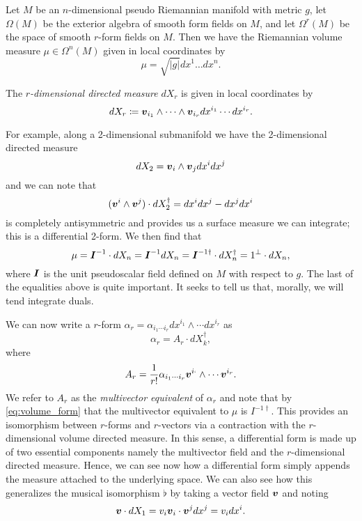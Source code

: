 Let $M$ be an $n$-dimensional pseudo Riemannian manifold with metric $g$, let $\Omega(M)$ be the exterior algebra of smooth form fields on $M$, and let $\Omega^r(M)$ be the space of smooth $r$-form fields on $M$. Then we have the Riemannian volume measure $\mu \in \Omega^n(M)$ given in local coordinates by
\begin{equation}
\mu = \sqrt{|g|} dx^1\dots dx^n.
\end{equation}
\begin{definition}
The \emph{$r$-dimensional directed measure} $dX_r$ is given in local coordinates by
\begin{equation}
    dX_r \coloneqq \boldsymbol{v}_{i_1} \wedge \cdots \wedge \boldsymbol{v}_{i_r} dx^{i_1} \cdots dx^{i_r}. 
\end{equation}
\end{definition}
For example, along a 2-dimensional submanifold we have the 2-dimensional directed measure 
\begin{equation}
    dX_2 = \boldsymbol{v}_i \wedge \boldsymbol{v}_j dx^i dx^j
\end{equation}
and we can note that 
\begin{equation}
(\boldsymbol{v}^i \wedge \boldsymbol{v}^j)\cdot dX_2^\dagger = dx^idx^j - dx^j dx^i
\end{equation}
is completely antisymmetric and provides us a surface measure we can integrate; this is a differential 2-form. We then find that
\begin{equation}
\label{eq:volume_form}
\mu = \boldsymbol{I}^{-1} \cdot dX_n = \boldsymbol{I}^{-1} dX_n = \boldsymbol{I}^{-1 \dagger} \cdot dX_n^\dagger = 1^\perp \cdot dX_n,
\end{equation}
where $\boldsymbol{I}$ is the unit pseudoscalar field defined on $M$ with respect to $g$. The last of the equalities above is quite important. It seeks to tell us that, morally, we will tend integrate duals.

We can now write a $r$-form $\alpha_r = \alpha_{i_1 \cdots i_r} dx^{i_1}\wedge \cdots dx^{i_r}$ as 
\begin{equation}
\alpha_r = A_r \cdot dX_k^\dagger,
\end{equation}
where
\begin{equation}
A_r = \frac{1}{r!} \alpha_{i_1 \cdots i_r} \boldsymbol{v}^{i_`} \wedge \cdots \boldsymbol{v}^{i_r}.
\end{equation}
We refer to $A_r$ as the \emph{multivector equivalent} of $\alpha_r$ and note that by \cref{eq:volume_form} that the multivector equivalent to $\mu$ is $I^{-1 \dagger}$. This provides an isomorphism between $r$-forms and $r$-vectors via a contraction with the $r$-dimensional volume directed measure. In this sense, a differential form is made up of two essential components namely the multivector field and the $r$-dimensional directed measure. Hence, we can see now how a differential form simply appends the measure attached to the underlying space. We can also see how this generalizes the musical isomorphism $\flat$ by taking a vector field $\boldsymbol{v}$ and noting
\begin{equation}
\label{eq:line_element}
\boldsymbol{v} \cdot dX_1 = v_i  \boldsymbol{v}_i \cdot \boldsymbol{v}^j dx^j = v_i dx^i.
\end{equation}

